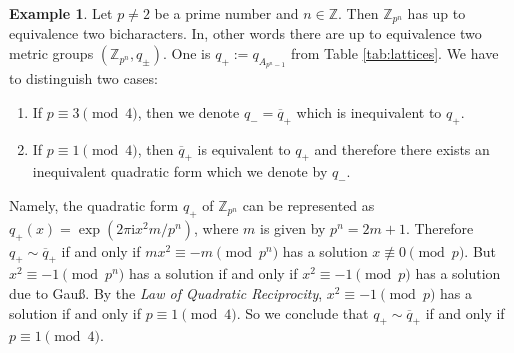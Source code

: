 \documentclass[twoside,11pt,reqno]{amsart}
\theoremstyle{definition}
\newtheorem{example}[thm]{Example}
\theoremstyle{remark}
\newcommand{\ZZ}{\mathbb{Z}}
\newcommand{\ima}{\mathrm{i}}
\begin{document}
\begin{example} 
%
  Let $p\neq 2$ be a prime number and $n\in\ZZ$.
  Then $\ZZ_{p^n}$ has up to equivalence two bicharacters.
  In, other words there are  up to equivalence two metric groups 
  $(\ZZ_{p^n},q_\pm)$.
  One is $q_+:=q_{A_{p^n-1}}$ from Table \ref{tab:lattices}.
  We have to distinguish two cases:
  \begin{enumerate}
    \item If $p\equiv 3 \pmod 4$, then we denote $q_-= \overline q_+$ which is 
      inequivalent to $q_+$. 
    \item If $p\equiv 1\pmod 4$, then $\overline q_+$ is equivalent to  $q_+$ 
      and therefore there exists an inequivalent quadratic form which we 
      denote by $q_-$.
  \end{enumerate}
  
%
%
  Namely, the quadratic form $q_+$ of $\ZZ_{p^n}$ can be represented as 
  $q_+(x)=\exp(2\pi \ima x^2 m /p^{n})$, where  $m$ is given by $p^n=2m+1$.
  Therefore $q_+\sim \overline q_+$ if and only if $m x^2 \equiv -m \pmod {p^n}$ 
  has a solution $x\not\equiv 0\pmod p$.
  But $x^2\equiv -1 \pmod{p^n}$ has a solution if and only if 
  $x^2\equiv -1 \pmod p$ has a solution due to Gauß. 
  By the \emph{Law of Quadratic Reciprocity}, $x^2\equiv -1 \pmod p$ has a 
  solution if and only if $p\equiv 1 \pmod 4$.
  So we conclude that $q_+\sim \overline q_+$ if and only if $p\equiv 1\pmod 4$.
%
\end{example}
%


%
\end{document}
